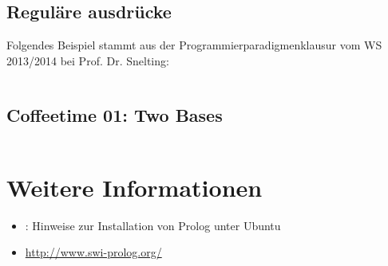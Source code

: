\inputminted[numbersep=5pt, tabsize=4]{prolog}{scripts/prolog/zahlen-bis-10.pl}

\subsection{Reguläre ausdrücke}
Folgendes Beispiel stammt aus der Programmierparadigmenklausur vom WS 2013/2014
bei Prof. Dr. Snelting:

\inputminted[numbersep=5pt, tabsize=4]{prolog}{scripts/prolog/regex.pl}

\subsection{Coffeetime 01: Two Bases}

\inputminted[numbersep=5pt, tabsize=4]{prolog}{scripts/prolog/01-two-bases.prolog}

\section{Weitere Informationen}
\begin{itemize}
    \item \href{http://wiki.ubuntuusers.de/Prolog}{}: Hinweise zur Installation von Prolog unter Ubuntu
    \item \url{http://www.swi-prolog.org/}
\end{itemize}
